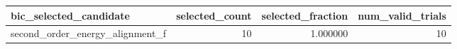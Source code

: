 \begin{tabular}{lrrr}
\toprule
bic_selected_candidate & selected_count & selected_fraction & num_valid_trials \\
\midrule
second_order_energy_alignment_f & 10 & 1.000000 & 10 \\
\bottomrule
\end{tabular}
